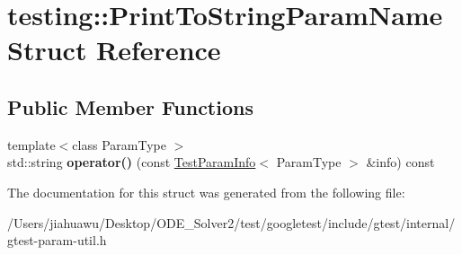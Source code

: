 \hypertarget{structtesting_1_1_print_to_string_param_name}{}\section{testing\+:\+:Print\+To\+String\+Param\+Name Struct Reference}
\label{structtesting_1_1_print_to_string_param_name}
\subsection*{Public Member Functions}
\begin{DoxyCompactItemize}
\item 
\mbox{\label{structtesting_1_1_print_to_string_param_name_a05b411cfb75dadb2c3c0355aee1dcf21}} 
{\footnotesize template$<$class Param\+Type $>$ }\\std\+::string {\bfseries operator()} (const \mbox{\hyperlink{structtesting_1_1_test_param_info}{Test\+Param\+Info}}$<$ Param\+Type $>$ \&info) const
\end{DoxyCompactItemize}


The documentation for this struct was generated from the following file\+:\begin{DoxyCompactItemize}
\item 
/\+Users/jiahuawu/\+Desktop/\+O\+D\+E\+\_\+\+Solver2/test/googletest/include/gtest/internal/gtest-\/param-\/util.\+h\end{DoxyCompactItemize}
